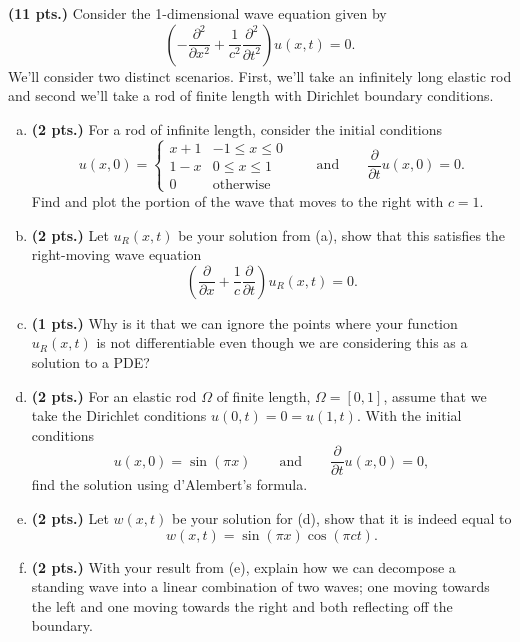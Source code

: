 \documentclass[12pt]{article} %
\begin{document}
\newpage
\begin{problem}
\textbf{(11 pts.)} Consider the 1-dimensional wave equation given by
\[
\left(-\frac{\partial^2}{\partial x^2} +\frac{1}{c^2} \frac{\partial^2}{\partial  t^2} \right) u(x,t) = 0.
\]
We'll consider two distinct scenarios. First, we'll take an infinitely long elastic rod and second we'll take a rod of finite length with Dirichlet boundary conditions.
\begin{enumerate}[(a)]
    \item \textbf{(2 pts.)} For a rod of infinite length, consider the initial conditions
    \[
    u(x,0) = \begin{cases} x+1 & -1\leq x \leq 0 \\ 1-x & 0\leq x \leq 1 \\ 0 & \textrm{otherwise} \end{cases} \qquad \textrm{and} \qquad \frac{\partial}{\partial t} u(x,0) = 0.
    \]
    Find and plot the portion of the wave that moves to the right with $c=1$.
    \item \textbf{(2 pts.)} Let $u_R(x,t)$ be your solution from (a), show that this satisfies the right-moving wave equation
    \[
    \left(\frac{\partial}{\partial x} + \frac{1}{c} \frac{\partial}{\partial t} \right)u_R(x,t) = 0.
    \]
    \item \textbf{(1 pts.)} Why is it that we can ignore the points where your function $u_R(x,t)$ is not differentiable even though we are considering this as a solution to a PDE?
    \item \textbf{(2 pts.)} For an elastic rod $\Omega$ of finite length, $\Omega = [0,1]$, assume that we take the Dirichlet conditions $u(0,t)=0=u(1,t)$.  With the initial conditions
    \[
    u(x,0) = \sin(\pi x) \qquad \textrm{and} \qquad \frac{\partial}{\partial t} u(x,0)=0,
    \]
    find the solution using d'Alembert's formula.
    \item \textbf{(2 pts.)} Let $w(x,t)$ be your solution for (d), show that it is indeed equal to
    \[
    w(x,t) = \sin(\pi x)\cos(\pi c t).
    \]
    \item \textbf{(2 pts.)} With your result from (e), explain how we can decompose a standing wave into a linear combination of two waves; one moving towards the left and one moving towards the right and both reflecting off the boundary.
\end{enumerate}
\end{problem}
\end{document}
